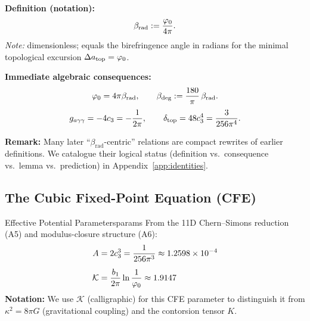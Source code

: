 \begin{tcolorbox}[colback=gray!5, colframe=gray!60, breakable,
    title={\textbf{Dictionary: $\beta_{\text{rad}}$ and Canonical Consequences}}, fonttitle=\bfseries\small]
\textbf{Definition (notation):}
\[
\beta_{\text{rad}} := \frac{\varphi_0}{4\pi}.
\]
\textit{Note:} dimensionless; equals the birefringence angle in radians for the minimal topological excursion $\Delta a_{\text{top}}=\varphi_0$.

\textbf{Immediate algebraic consequences:}
\begin{equation}
    \varphi_0 = 4\pi\beta_{\text{rad}}, 
    \qquad 
    \beta_{\text{deg}} := \frac{180}{\pi}\,\beta_{\text{rad}}.
\end{equation}
\begin{equation}
    g_{a\gamma\gamma} = -4c_3 = -\frac{1}{2\pi},
    \qquad
    \delta_{\mathrm{top}} = 48c_3^4 = \frac{3}{256\pi^4}.
\end{equation}

\textbf{Remark:} Many later ``$\beta_{\text{rad}}$-centric'' relations are compact rewrites of earlier definitions. 
We catalogue their logical status (definition vs.\ consequence vs.\ lemma vs.\ prediction) in Appendix~\ref{app:identities}.
\end{tcolorbox}

\TFPTCoreInvariantTable

\subsection{The Cubic Fixed-Point Equation (CFE)}

\begin{definition}{Effective Potential Parameters}{params}
From the 11D Chern--Simons reduction (A5) and modulus-closure structure (A6):
\begin{align}
    A &= 2c_3^3 = \frac{1}{256\pi^3} \approx 1.2598 \times 10^{-4}\\[0.5em]
    \mathcal{K} &= \frac{b_1}{2\pi}\ln\frac{1}{\varphi_0} \approx 1.9147
\end{align}
\textbf{Notation:} We use $\mathcal{K}$ (calligraphic) for this CFE parameter to 
distinguish it from $\kappa^2 = 8\pi G$ (gravitational coupling) and the contorsion tensor $K$.
\end{definition}

